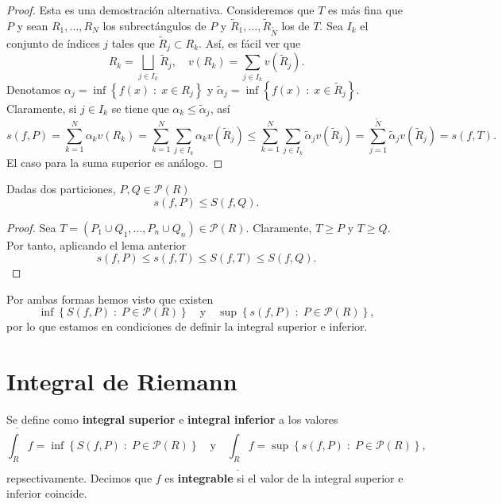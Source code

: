 \begin{proof}
	Esta es una demostración alternativa. Consideremos que $\displaystyle T $ es más fina que $\displaystyle P $ y sean $\displaystyle R_{1}, \ldots, R_{N} $ los subrectángulos de $\displaystyle P $ y $\displaystyle \tilde{R}_{1}, \ldots, \tilde{R} _{\tilde{N}}$ los de $\displaystyle T $.
	Sea $\displaystyle I_{k} $ el conjunto de índices $\displaystyle j $ tales que $\displaystyle \tilde{R}_{j} \subset R_{k} $. Así, es fácil ver que
	\[R_{k} = \bigsqcup_{j \in I_{k}}\tilde{R}_{j}, \quad v\left(R_{k}\right) = \sum_{j \in I_{k}}v\left(\tilde{R}_{j}\right) .\]
	Denotamos $\displaystyle \alpha_{j} = \inf \left\{ f\left(x\right) \; : \; x \in R_{j}\right\}  $ y $\displaystyle \tilde{\alpha }_{j} = \inf \left\{ f\left(x\right) \; :\; x \in \tilde{R}_{j}\right\}  $. 
	Claramente, si $\displaystyle j \in I_{k} $ se tiene que $\displaystyle \alpha _{k} \leq \tilde{\alpha}_{j} $, así
	\[s\left(f,P\right) = \sum^{N}_{k = 1}\alpha_{k}v\left(R_{k}\right) = \sum^{N}_{k = 1}\sum_{j \in I_{k}}\alpha_{k}v\left(\tilde{R}_{j}\right) \leq \sum^{N}_{k = 1}\sum_{j \in I_{k}}\tilde{\alpha}_{j}v\left(\tilde{R}_{j}\right) = \sum^{\tilde{N}}_{j = 1}\tilde{\alpha}_{j}v\left(\tilde{R}_{j}\right) = s\left(f,T\right) .\]
El caso para la suma superior es análogo.	
\end{proof}

\begin{prop}
Dadas dos particiones, $\displaystyle P, Q \in \mathcal{P}\left(R\right) $
\[s\left(f,P\right) \leq S\left(f,Q\right) .\]
\end{prop}
\begin{proof}
Sea $\displaystyle T = \left(P_{1} \cup Q_{1}, \ldots, P_{n} \cup Q_{n}\right)\in \mathcal{P}\left(R\right) $. Claramente, $\displaystyle T \geq P $ y $\displaystyle T \geq Q $. Por tanto, aplicando el lema anterior
\[ s\left(f,P\right) \leq s\left(f, T\right)\leq S\left(f,T\right)\leq S\left(f,Q\right).\]
\end{proof}
Por ambas formas hemos visto que existen
\[\inf \left\{ S\left(f,P\right) \; : \; P \in \mathcal{P}\left(R\right)\right\} \quad \text{y} \quad \sup \left\{ s\left(f,P\right) \; : \; P \in \mathcal{P}\left(R\right)\right\}  ,\]
por lo que estamos en condiciones de definir la integral superior e inferior. 
\section{Integral de Riemann}
\begin{definition}
Se define como \textbf{integral superior} e \textbf{integral inferior} a los valores
\[\overline{\int _{R}}f = \inf \left\{ S\left(f,P\right) \; : \; P \in \mathcal{P}\left(R\right)\right\} \quad \text{y} \quad \underline{\int _{R}}f = \sup \left\{ s\left(f,P\right) \; : \; P \in \mathcal{P}\left(R\right)\right\} ,\]
repsectivamente. Decimos que $\displaystyle f $ es \textbf{integrable} si el valor de la integral superior e inferior coincide.
\end{definition}

